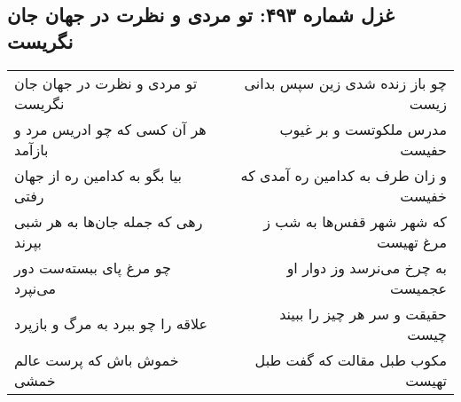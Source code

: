 \begin{center}
\section*{غزل شماره ۴۹۳: تو مردی و نظرت در جهان جان نگریست}
\label{sec:0493}
\begin{longtable}{l p{0.5cm} r}
تو مردی و نظرت در جهان جان نگریست
&&
چو باز زنده شدی زین سپس بدانی زیست
\\
هر آن کسی که چو ادریس مرد و بازآمد
&&
مدرس ملکوتست و بر غیوب حفیست
\\
بیا بگو به کدامین ره از جهان رفتی
&&
و زان طرف به کدامین ره آمدی که خفیست
\\
رهی که جمله جان‌ها به هر شبی بپرند
&&
که شهر شهر قفس‌ها به شب ز مرغ تهیست
\\
چو مرغ پای ببسته‌ست دور می‌نپرد
&&
به چرخ می‌نرسد وز دوار او عجمیست
\\
علاقه را چو ببرد به مرگ و بازپرد
&&
حقیقت و سر هر چیز را ببیند چیست
\\
خموش باش که پرست عالم خمشی
&&
مکوب طبل مقالت که گفت طبل تهیست
\\
\end{longtable}
\end{center}
